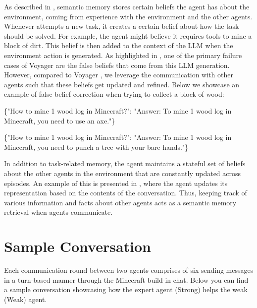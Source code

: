 As described in , semantic memory stores certain beliefs the agent has about the environment, coming from experience with the environment and the other \collabvoyager agents. Whenever \collabvoyager attempts a new task, it creates a certain belief about how the task should be solved. For example, the agent might believe it requires tools to mine a block of dirt. This belief is then added to the context of the LLM when the environment action is generated. As highlighted in , one of the primary failure cases of Voyager are the false beliefs that come from this LLM generation. However, compared to Voyager \citep{wang2023voyager}, we leverage the communication with other \collabvoyager agents such that these beliefs get updated and refined. Below we showcase an example of false belief correction when trying to collect a block of wood:



\begin{tcolorbox}[title=Initial belief inside the semantic memory, label=box:response-semantic-1]
\{"How to mine 1 wood log in Minecraft?": "Answer: To mine 1 wood log in Minecraft, you need to use an axe."\}
\end{tcolorbox}

\begin{tcolorbox}[title=Updated belief after communication, label=box:response-semantic-1]
\{"How to mine 1 wood log in Minecraft?": "Answer: To mine 1 wood log in Minecraft, you need to punch a tree with your bare hands."\}
\end{tcolorbox}
In addition to task-related memory, the \collabvoyager agent maintains a stateful set of beliefs about the other agents in the environment that are constantly updated across episodes. An example of this is presented in , where the agent updates its representation based on the contents of the conversation. Thus, keeping track of various information and facts about other \collabvoyager agents acts as a semantic memory retrieval when agents communicate.



\section{Sample Conversation}
\label{appendix:sample-conv}

Each communication round between two \collabvoyager agents comprises of six sending messages in a turn-based manner through the Minecraft build-in chat. Below you can find a sample conversation showcasing how the expert agent (Strong) helps the weak (Weak) agent. 

